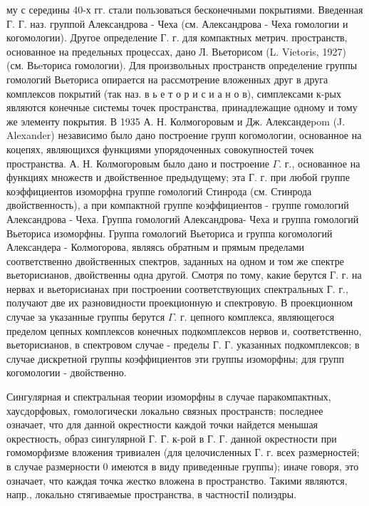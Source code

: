 \documentclass[10pt]{article}
\begin{document}
му с середины 40-х гг. стали пользоваться бесконечными покрытиями. Введенная Г. Г. наз. группой Александрова - Чеха (см. Александрова - Чеха гомологии и когомологии). Другое определение Г. г. для компактных метрич. пространств, основанное на предельных процессах, дано Л. Вьеторисом (L. Vietoris, 1927) (см. Вьeториса гомологии). Для произвольных пространств определение группы гомологий Вьеториса опирается на рассмотрение вложенных друг в друга комплексов покрытий (так наз. в ь е т о р и с и а н о в), симплексами к-рых являются конечные системы точек пространства, принадлежащие одному и тому же элементу покрытия. В 1935 А. Н. Колмогоровым и Дж. Александеpom (J. Alexander) независимо было дано построение групп когомологии, основанное на коцепях, являющихся функциями упорядоченных совокупностей точек пространства. А. Н. Колмогоровым было дано и построение $\Gamma$. г., основанное на функциях множеств и двойственное предыдущему; эта Г. г. при любой группе коэффициентов изоморфна группе гомологий Стинрода (см. Стинрода двойственность), а при компактной группе коэффициентов - группе гомологий Александрова - Чеха. Группа гомологий Александрова- Чеха и группа гомологий Вьеториса изоморфны. Группа гомологий Вьеториса и группа когомологий Александера - Колмогорова, являясь обратным и прямым пределами соответственно двойственных спектров, заданных на одном и том же спектре вьеторисианов, двойственны одна другой. Смотря по тому, какие берутся Г. г. на нервах и вьеторисианах при построении соответствующих спектральных Г. г., получают две их разновидности проекционную и спектровую. В проекционном случае за указанные группы берутся $\Gamma$. г. цепного комплекса, являющегося пределом цепных комплексов конечных подкомплексов нервов и, соответственно, вьеторисианов, в спектровом случае - пределы Г. Г. указанных подкомплексов; в случае дискретной группы коэффициентов эти группы изоморфны; для групп когомологии - двойственно.



Сингулярная и спектральная теории изоморфны в случае паракомпактных, хаусдорфовых, гомологически локально связных пространств; последнее означает, что для данной окрестности каждой точки найдется менышая окрестность, образ сингулярной Г. Г. к-рой в Г. Г. данной окрестности при гомоморфизме вложения тривиален (для целочисленных Г. г. всех размерностей; в случае размерности 0 имеются в виду приведенные группы); иначе говоря, это означает, что каждая точка жестко вложена в пространство. Такими являются, напр., локально стягиваемые пространства, в частностіІ полиэдры.
\end{document}
